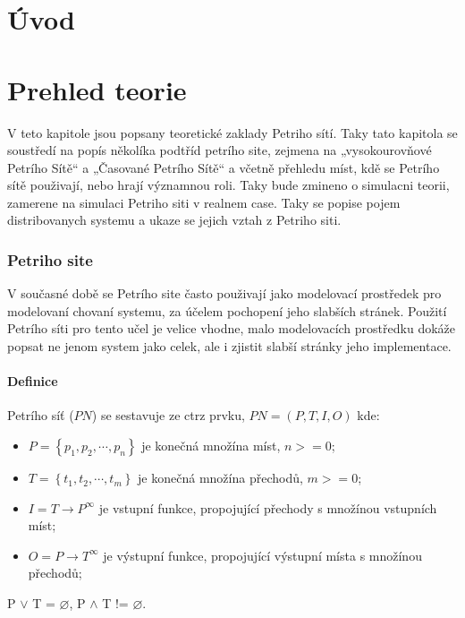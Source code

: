\chapter{Úvod}
\chapter{Prehled teorie}
\label{prehled}

V teto kapitole jsou popsany teoretické zaklady Petriho sítí. Taky tato kapitola se soustředí na popís několíka podtříd petrího site, zejmena na „vysokourovňové Petrího Sítě“ a „Časované Petrího Sítě“ a  včetně přehledu míst, kdě se Petrího sítě použivají, nebo hrají významnou roli. Taky bude zmineno o simulacni teorii, zamerene na simulaci Petriho siti v realnem case. Taky se popise pojem distribovanych systemu a ukaze se jejich vztah z Petriho siti.

\subsection*{Petriho site}
V současné době se Petrího site často použivají jako modelovací prostředek pro modelovaní chovaní systemu, za účelem pochopení jeho slabších stránek. Použití Petrího síti pro tento učel je velice vhodne, malo modelovacích prostředku dokáže popsat ne jenom system jako celek, ale i zjistit slabší stránky jeho implementace.
\subsubsection*{Definice}

Petrího síť ($PN$) se sestavuje ze ctrz prvku, $PN = \left(P, T, I, O\right)$ kde:
  \begin{itemize}
    \item $P = \left\{p_1, p_2, \cdots , p_n\right\}$ je konečná množína míst, $n >= 0$; \\
    \item $T = \left\{t_1, t_2, \cdots , t_m\right\}$ je konečná množína přechodů, $m >= 0$; \\
    \item $I = T \rightarrow P^\infty$ je vstupní funkce, propojující přechody s množínou vstupních míst; \\
    \item $O = P \rightarrow T^\infty$ je výstupní funkce, propojující výstupní místa s množínou přechodů; \\
  \end{itemize}
P $\vee$ T = $\varnothing$, P $\wedge$ T != $\varnothing$. 


